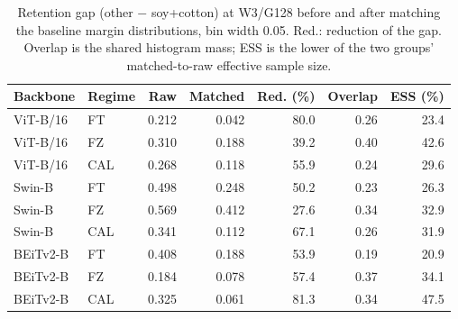 \begin{table}[t]
\centering
\caption{Retention gap (other $-$ soy+cotton) at W3/G128 before and after matching the baseline margin distributions, bin width 0.05. Red.: reduction of the gap. Overlap is the shared histogram mass; ESS is the lower of the two groups' matched-to-raw effective sample size.}
\label{tab:margin}
\setlength{\tabcolsep}{1.6pt}
\small
\begin{tabular}{llrrrrr}
\toprule
Backbone & Regime & Raw & Matched & Red. (\%) & Overlap & ESS (\%) \\
\midrule
ViT-B/16 & FT & 0.212 & 0.042 & 80.0 & 0.26 & 23.4 \\
ViT-B/16 & FZ & 0.310 & 0.188 & 39.2 & 0.40 & 42.6 \\
ViT-B/16 & CAL & 0.268 & 0.118 & 55.9 & 0.24 & 29.6 \\
Swin-B & FT & 0.498 & 0.248 & 50.2 & 0.23 & 26.3 \\
Swin-B & FZ & 0.569 & 0.412 & 27.6 & 0.34 & 32.9 \\
Swin-B & CAL & 0.341 & 0.112 & 67.1 & 0.26 & 31.9 \\
BEiTv2-B & FT & 0.408 & 0.188 & 53.9 & 0.19 & 20.9 \\
BEiTv2-B & FZ & 0.184 & 0.078 & 57.4 & 0.37 & 34.1 \\
BEiTv2-B & CAL & 0.325 & 0.061 & 81.3 & 0.34 & 47.5 \\
\bottomrule
\end{tabular}
\end{table}
